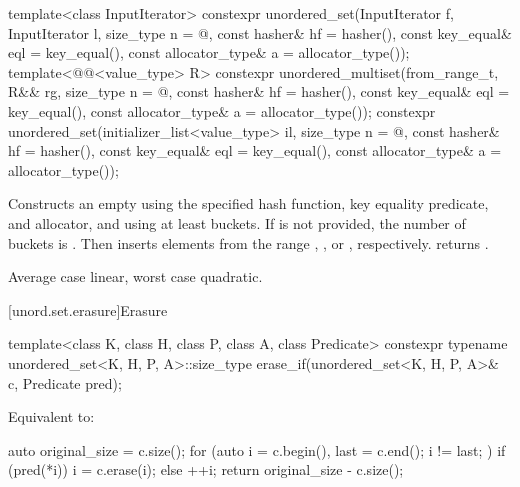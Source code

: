%
\begin{itemdecl}
template<class InputIterator>
  constexpr unordered_set(InputIterator f, InputIterator l,
                          size_type n = @\seebelow@, const hasher& hf = hasher(),
                          const key_equal& eql = key_equal(),
                          const allocator_type& a = allocator_type());
template<@@<value_type> R>
  constexpr unordered_multiset(from_range_t, R&& rg,
                               size_type n = @\seebelow@, const hasher& hf = hasher(),
                               const key_equal& eql = key_equal(),
                               const allocator_type& a = allocator_type());
constexpr unordered_set(initializer_list<value_type> il,
                        size_type n = @\seebelow@, const hasher& hf = hasher(),
                        const key_equal& eql = key_equal(),
                        const allocator_type& a = allocator_type());
\end{itemdecl}

\begin{itemdescr}
\pnum
\effects
Constructs an empty  using the
specified hash function, key equality predicate, and allocator, and
using at least  buckets. If  is not
provided, the number of buckets is . Then
inserts elements from the range , , or ,
respectively.
 returns .

\pnum
\complexity
Average case linear, worst case quadratic.
\end{itemdescr}

[unord.set.erasure]{Erasure}

%
\begin{itemdecl}
template<class K, class H, class P, class A, class Predicate>
  constexpr typename unordered_set<K, H, P, A>::size_type
    erase_if(unordered_set<K, H, P, A>& c, Predicate pred);
\end{itemdecl}

\begin{itemdescr}
\pnum
\effects
Equivalent to:
\begin{codeblock}
auto original_size = c.size();
for (auto i = c.begin(), last = c.end(); i != last; ) {
  if (pred(*i)) {
    i = c.erase(i);
  } else {
    ++i;
  }
}
return original_size - c.size();
\end{codeblock}
\end{itemdescr}

